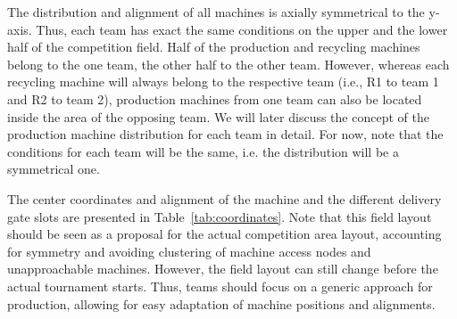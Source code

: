 \documentclass[12pt,twoside]{article}
\begin{document}
The distribution and alignment of all machines is axially symmetrical
to the y-axis. Thus, each team has exact the same conditions on the
upper and the lower half of the competition field. Half of the
production and recycling machines belong to the one team, the other
half to the other team. However, whereas each recycling machine will
always belong to the respective team (i.e., R1 to team 1 and R2 to
team 2), production machines from one team can also be located inside
the area of the opposing team. We will later discuss the concept of
the production machine distribution for each team in detail. For now,
note that the conditions for each team will be the same, i.e. the
distribution will be a symmetrical one.

The center coordinates and alignment of the machine and the different
delivery gate slots are presented in Table~\ref{tab:coordinates}. Note
that this field layout should be seen as a proposal for the actual
competition area layout, accounting for symmetry and avoiding
clustering of machine access nodes and unapproachable
machines. However, the field layout can still change before the actual
tournament starts. Thus, teams should focus on a generic approach for
production, allowing for easy adaptation of machine positions and
alignments.
\end{document}
